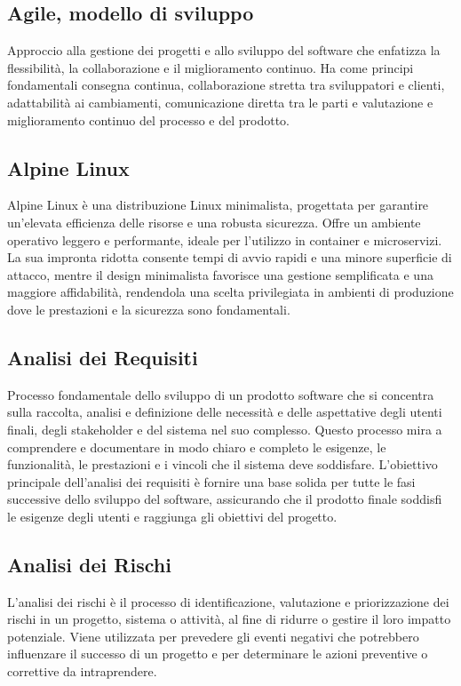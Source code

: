 \hypertarget{sec:modello_agile}{}
\subsection*{Agile, modello di sviluppo}
Approccio alla gestione dei progetti e allo sviluppo del software che enfatizza la flessibilità, la collaborazione e il miglioramento continuo. 
Ha come principi fondamentali consegna continua, collaborazione stretta tra sviluppatori e clienti, adattabilità ai cambiamenti, 
comunicazione diretta tra le parti e valutazione e miglioramento continuo del processo e del prodotto.

\hypertarget{sec:alpine_linux}{}
\subsection*{Alpine Linux}
Alpine Linux è una distribuzione Linux minimalista, progettata per garantire un'elevata efficienza delle risorse e una robusta sicurezza. 
Offre un ambiente operativo leggero e performante, ideale per l'utilizzo in container e microservizi. La sua 
impronta ridotta consente tempi di avvio rapidi e una minore superficie di attacco, mentre il design minimalista favorisce una gestione semplificata 
e una maggiore affidabilità, rendendola una scelta privilegiata in ambienti di produzione dove le prestazioni e la sicurezza sono fondamentali.


\subsection*{Analisi dei Requisiti}
Processo fondamentale dello sviluppo di un prodotto software che si concentra sulla raccolta, analisi e definizione delle necessità e delle aspettative 
degli utenti finali, degli stakeholder e del sistema nel suo complesso. Questo processo mira a comprendere e documentare in modo chiaro e completo le 
esigenze, le funzionalità, le prestazioni e i vincoli che il sistema deve soddisfare. L’obiettivo principale dell’analisi dei requisiti è fornire una 
base solida per tutte le fasi successive dello sviluppo del software, assicurando che il prodotto finale soddisfi le esigenze degli utenti e raggiunga 
gli obiettivi del progetto.

\subsection*{Analisi dei Rischi}
L'analisi dei rischi è il processo di identificazione, valutazione e priorizzazione dei rischi in un progetto, sistema o attività, al fine di ridurre 
o gestire il loro impatto potenziale. Viene utilizzata per prevedere gli eventi negativi che potrebbero influenzare il successo di un progetto e per 
determinare le azioni preventive o correttive da intraprendere.

